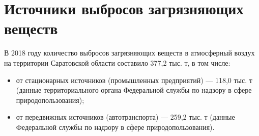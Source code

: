 
\section{Источники выбросов загрязняющих веществ}
\begin{frame}{\insertsectionhead}
    \footnotesize
    В 2018 году количество выбросов загрязняющих веществ в 
    атмосферный воздух на территории Саратовской 
    области составило 377,2 тыс. т, в том числе:

    \begin{itemize}
        \item от стационарных источников (промышленных предприятий) --- 
            118,0 тыс. т (данные территориального органа Федеральной 
            службы по надзору в сфере природопользования);

        \item от передвижных источников (автотранспорта) --- 259,2 тыс. т 
            (данные Федеральной службы по надзору в сфере природопользования).
    \end{itemize}
\end{frame}
